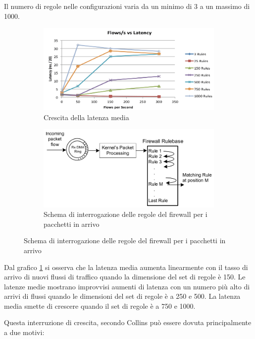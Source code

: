 Il numero di regole nelle configurazioni varia da un minimo di 3 a un massimo di 1000.

\begin{figure}[H]
  \centering
  \begin{subfigure}[b]{0.46\linewidth}
    \includegraphics[width=\linewidth]{img/flow_latency.png}
    \caption{Crescita della latenza media}
    \label{fig:flowlatency}
  \end{subfigure}
  \begin{subfigure}[b]{0.46\linewidth}
    \includegraphics[width=\linewidth]{img/firewall_rulebase.png}
    \caption{Schema di interrogazione delle regole del firewall per i pacchetti in arrivo}
    \label{fig:firewallrulebase}
  \end{subfigure}
\end{figure}

Dal grafico \ref{fig:flowlatency} si osserva che la latenza media aumenta linearmente con il tasso di arrivo di nuovi flussi di traffico quando la dimensione del set di regole è 150. Le latenze medie mostrano improvvisi aumenti di latenza con un numero più alto di arrivi di flussi quando le dimensioni del set di regole è a 250 e 500. La latenza media smette di crescere quando il set di regole è a 750 e 1000.

Questa interruzione di crescita, secondo Collins può essere dovuta principalmente a due motivi:

